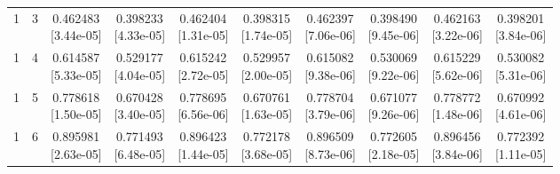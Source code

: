 \documentclass[12pt,letterpaper]{article}
\theoremstyle{plain}
\theoremstyle{definition}
\begin{document}
\begin{table}[p]
\begin{adjustbox}{max width=\linewidth}
\begin{tabular}{@{}rr*{8}{c}@{}}
1 & 3 & \shortstack{0.462483\\[-1pt]{\scriptsize[3.44e-05]}} & \shortstack{0.398233\\[-1pt]{\scriptsize[4.33e-05]}} & \shortstack{0.462404\\[-1pt]{\scriptsize[1.31e-05]}} & \shortstack{0.398315\\[-1pt]{\scriptsize[1.74e-05]}} & \shortstack{0.462397\\[-1pt]{\scriptsize[7.06e-06]}} & \shortstack{0.398490\\[-1pt]{\scriptsize[9.45e-06]}} & \shortstack{0.462163\\[-1pt]{\scriptsize[3.22e-06]}} & \shortstack{0.398201\\[-1pt]{\scriptsize[3.84e-06]}}\\
1 & 4 & \shortstack{0.614587\\[-1pt]{\scriptsize[5.33e-05]}} & \shortstack{0.529177\\[-1pt]{\scriptsize[4.04e-05]}} & \shortstack{0.615242\\[-1pt]{\scriptsize[2.72e-05]}} & \shortstack{0.529957\\[-1pt]{\scriptsize[2.00e-05]}} & \shortstack{0.615082\\[-1pt]{\scriptsize[9.38e-06]}} & \shortstack{0.530069\\[-1pt]{\scriptsize[9.22e-06]}} & \shortstack{0.615229\\[-1pt]{\scriptsize[5.62e-06]}} & \shortstack{0.530082\\[-1pt]{\scriptsize[5.31e-06]}}\\
1 & 5 & \shortstack{0.778618\\[-1pt]{\scriptsize[1.50e-05]}} & \shortstack{0.670428\\[-1pt]{\scriptsize[3.40e-05]}} & \shortstack{0.778695\\[-1pt]{\scriptsize[6.56e-06]}} & \shortstack{0.670761\\[-1pt]{\scriptsize[1.63e-05]}} & \shortstack{0.778704\\[-1pt]{\scriptsize[3.79e-06]}} & \shortstack{0.671077\\[-1pt]{\scriptsize[9.26e-06]}} & \shortstack{0.778772\\[-1pt]{\scriptsize[1.48e-06]}} & \shortstack{0.670992\\[-1pt]{\scriptsize[4.61e-06]}}\\
1 & 6 & \shortstack{0.895981\\[-1pt]{\scriptsize[2.63e-05]}} & \shortstack{0.771493\\[-1pt]{\scriptsize[6.48e-05]}} & \shortstack{0.896423\\[-1pt]{\scriptsize[1.44e-05]}} & \shortstack{0.772178\\[-1pt]{\scriptsize[3.68e-05]}} & \shortstack{0.896509\\[-1pt]{\scriptsize[8.73e-06]}} & \shortstack{0.772605\\[-1pt]{\scriptsize[2.18e-05]}} & \shortstack{0.896456\\[-1pt]{\scriptsize[3.84e-06]}} & \shortstack{0.772392\\[-1pt]{\scriptsize[1.11e-05]}}\\

\end{tabular}
\end{adjustbox}
\end{table}
\end{document}
